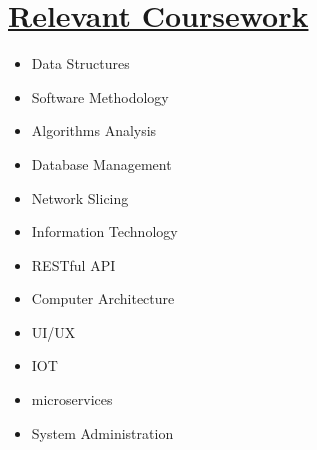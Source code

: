 \documentclass[letterpaper,11pt]{article}
\newcommand{\resumeSubHeadingListStart}{\begin{itemize}[leftmargin=0.0in, label={}]}
\newcommand{\resumeSubHeadingListEnd}{\end{itemize}}
\begin{document}
 \vspace{-18pt}
\section{\href{https://www.linkedin.com/in/yakkshit/details/courses/}{Relevant Coursework} \faLink}
        \begin{multicols}{4}
            \begin{itemize}[itemsep=-4pt, parsep=3pt]
                \item\small Data Structures
                \item Software Methodology
                \item Algorithms Analysis
                \item Database Management
                \item Network Slicing
                \item Information Technology
                \item RESTful API
                \item Computer Architecture \\
                \item UI/UX
                \item IOT
                \item microservices
                \item System Administration\\
            \end{itemize}
        \end{multicols}
        \vspace*{2.0\multicolsep}
    \vspace{-5pt}
\end{document}
